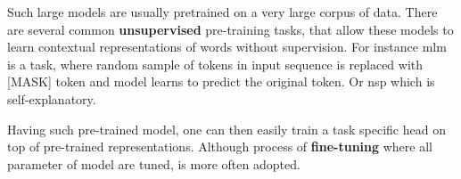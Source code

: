 Such large models are usually pretrained on a very large corpus of data. There are several common \textbf{unsupervised} pre-training tasks, that allow these models to learn contextual representations of words without supervision. For instance \gls{mlm} is a task, where random sample of tokens in input sequence is replaced with [MASK] token and model learns to predict the original token. Or \gls{nsp} which is self-explanatory.

Having such pre-trained model, one can then easily train a task specific head on top of pre-trained representations. Although process of \textbf{fine-tuning} where all parameter of model are tuned, is more often adopted.
